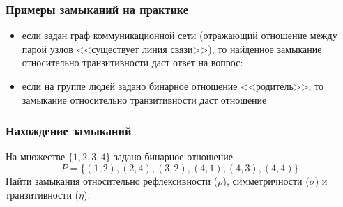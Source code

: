 \begin{frame}
    \frametitle{Примеры замыканий на практике}
    
    \begin{itemize}
        \item если задан граф коммуникационной сети (отражающий отношение между парой узлов <<существует линия связи>>), то найденное замыкание относительно транзитивности даст ответ на вопрос: 
        
        \item если на группе людей задано бинарное отношение <<родитель>>, то замыкание относительно транзитивности даст отношение
    \end{itemize}
\end{frame}

\begin{frame}
    \frametitle{Нахождение замыканий}
    
    \begin{example}
        На множестве $\{1,2,3,4\}$ задано бинарное отношение
        \[
            P=\{(1,2),(2,4),(3,2),(4,1),(4,3),(4,4)\}.
        \]
        Найти замыкания относительно рефлексивности ($\rho$), симметричности ($\sigma$) и транзитивности ($\eta$).
    \end{example}
\end{frame}

